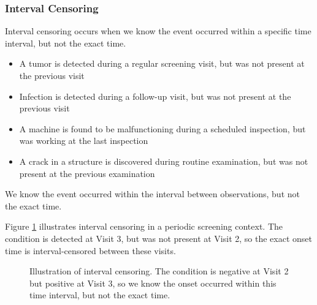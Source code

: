 \subsubsection{Interval Censoring}

Interval censoring occurs when we know the event occurred within a specific time interval, but not the exact time.

\begin{examplebox}[title=Examples of Interval Censoring]
\begin{itemize}
    \item A tumor is detected during a regular screening visit, but was not present at the previous visit
    \item Infection is detected during a follow-up visit, but was not present at the previous visit
    \item A machine is found to be malfunctioning during a scheduled inspection, but was working at the last inspection
    \item A crack in a structure is discovered during routine examination, but was not present at the previous examination
\end{itemize}

We know the event occurred within the interval between observations, but not the exact time.
\end{examplebox}

Figure \ref{fig:interval-censoring} illustrates interval censoring in a periodic screening context. The condition is detected at Visit 3, but was not present at Visit 2, so the exact onset time is interval-censored between these visits.

\begin{figure}[htbp]
    \centering
    \caption{Illustration of interval censoring. The condition is negative at Visit 2 but positive at Visit 3, so we know the onset occurred within this time interval, but not the exact time.}
    \label{fig:interval-censoring}
\end{figure}

